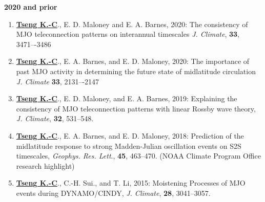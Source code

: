 \documentclass{article}
\begin{document}
\normalsize{\bf{2020} and prior} 
\begin{enumerate}[resume]  
	\item \normalsize{\bf{\underline{Tseng K.-C}}}., E. D. Maloney and E. A. Barnes, 2020: The consistency of MJO teleconnection patterns on interannual timescales \textit{J. Climate}, \normalsize{\bf{33}}, 3471–-3486
	\item \normalsize{\bf{\underline{Tseng K.-C}}}., E. A. Barnes, and E. D. Maloney, 2020: The importance of past MJO activity in determining the future state of midlatitude circulation  \textit{J. Climate} \normalsize{\bf{33}}, 2131–-2147 \par
	\item \normalsize{\bf{\underline{Tseng K.-C}}}., E. D. Maloney, and E. A. Barnes, 2019: Explaining the consistency of MJO teleconnection patterns with linear Rossby wave theory, \textit{J. Climate}, \normalsize{\bf{32}}, 531--548.
	\item \normalsize{\bf{\underline{Tseng K.-C}}}., E. A. Barnes, and E. D. Maloney, 2018: Prediction of the midlatitude response to strong Madden-Julian oscillation events on S2S timescales, \textit{Geophys. Res. Lett}., \normalsize{\bf{45}}, 463--470. (NOAA Climate Program Office research highlight)\par
	\item \normalsize{\bf{\underline{Tseng K.-C}}}., C.-H. Sui., and T. Li, 2015: Moistening Processes of MJO events during DYNAMO/CINDY, \textit{J. Climate}, \normalsize{\bf{28}}, 3041--3057.
    \end{enumerate}
\end{document}
